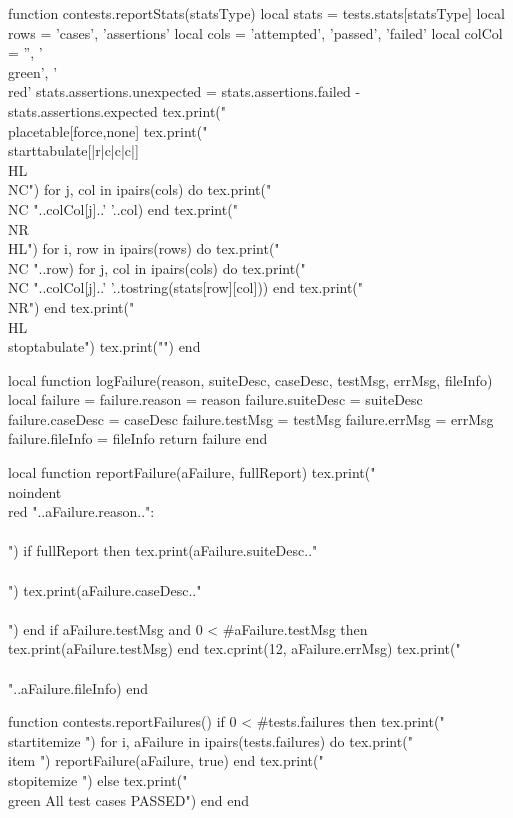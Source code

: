 function contests.reportStats(statsType)
  local stats = tests.stats[statsType]
  local rows = { 'cases', 'assertions' }
  local cols =
    { 'attempted', 'passed', 'failed' }
  local colCol = { '', '\\green', '\\red' }
  stats.assertions.unexpected =
    stats.assertions.failed - stats.assertions.expected
  tex.print("\\placetable[force,none]{}{%
  tex.print("\\starttabulate[|r|c|c|c|]\\HL\\NC")
  for j, col in ipairs(cols) do
    tex.print("\\NC "..colCol[j]..' '..col)
  end
  tex.print("\\NR\\HL")
  for i, row in ipairs(rows) do
    tex.print("\\NC "..row)
    for j, col in ipairs(cols) do
      tex.print("\\NC "..colCol[j]..' '..tostring(stats[row][col]))
    end
    tex.print("\\NR")
  end
  tex.print("\\HL\\stoptabulate")
  tex.print("}")
end

local function logFailure(reason, suiteDesc, caseDesc,
                          testMsg, errMsg, fileInfo)
  local failure = {}
  failure.reason    = reason
  failure.suiteDesc = suiteDesc
  failure.caseDesc  = caseDesc
  failure.testMsg   = testMsg
  failure.errMsg    = errMsg
  failure.fileInfo  = fileInfo
  return failure
end

local function reportFailure(aFailure, fullReport)
  tex.print("\\noindent{\\red "..aFailure.reason.."}:\\\\")
  if fullReport then
    tex.print(aFailure.suiteDesc.."\\\\")
    tex.print(aFailure.caseDesc.."\\\\")
  end
  if aFailure.testMsg and 0 < #aFailure.testMsg then
    tex.print(aFailure.testMsg)
  end
  tex.cprint(12, aFailure.errMsg)
  tex.print("\\\\"..aFailure.fileInfo)
end

function contests.reportFailures()
  if 0 < #tests.failures then
    tex.print("\\startitemize ")
    for i, aFailure in ipairs(tests.failures) do
      tex.print("\\item ")
      reportFailure(aFailure, true)
    end
    tex.print("\\stopitemize ")
  else
    tex.print("{\\green All test cases PASSED}")
  end
end

\stopLuaCode

\stopchapter